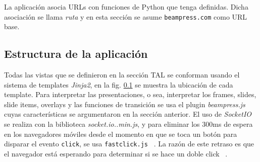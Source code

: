 		La aplicación asocia URLs con funciones de Python que tenga definidas. Dicha asociación se llama \textit{ruta} y en esta sección se asume \texttt{beampress.com} como URL base.
		
		\subsection{Estructura de la aplicación} %
		\label{sub:estructura_de_la_aplicacion}
			Todas las vistas que se definieron en la sección TAL se conforman usando el sistema de templates \textit{Jinja2}, en la fig. \ref{sub:estructura_de_la_aplicacion} se muestra la ubicación de cada template.
			Para interpretar las presentaciones, o sea, interpretar los frames, slides, slide items, overlays y las funciones de transición se usa el plugin \textit{beampress.js} cuyas características se argumentaron en la sección anterior. El uso de \textit{SocketIO} ~\cite{socketio} se realiza con la biblioteca \textit{socket.io..min.js}, y para eliminar los 300ms de espera en los navegadores móviles desde el momento en que se toca un botón para disparar el evento \texttt{click}, se usa \texttt{fastclick.js} ~\cite{fastclick}. La razón de este retraso es que el navegador está esperando para determinar si se hace un doble click ~\cite{fior}.
